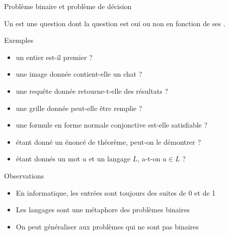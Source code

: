 
\begingroup

\begin{frame}{Problème binaire et problème de décision}
  
  Un  est une question dont la question est \alert{oui} ou \alert{non} en fonction de ses .
  
  \begin{exampleblock}{Exemples}
    \vspace{-2mm}
    \begin{itemize}
    \item {} un entier est-il premier ?  
    \item {} une image donnée contient-elle un chat ? 
    \item {} une requête donnée retourne-t-elle des résultats ?  
    \item {} une grille donnée peut-elle être remplie ? 
    \item {} une formule en forme normale conjonctive est-elle satisfiable ? 
    \item {} étant donné un énoncé de théorème, peut-on le démontrer ? 
    \item {} étant donnés un mot $u$ et un langage $L$, a-t-on $u\in L$ ? 
    \end{itemize}
  \end{exampleblock}
  \pause
  \begin{alertblock}{Observations}
    \vspace{-2mm}
    \begin{itemize}
    \item En informatique, les entrées sont toujours des suites de 0 et de 1
    \item \alert{Les langages sont une métaphore des problèmes binaires}
    \item On peut généraliser aux problèmes qui ne sont pas binaires
    \end{itemize}
  \end{alertblock}
  
\end{frame}

\endgroup
